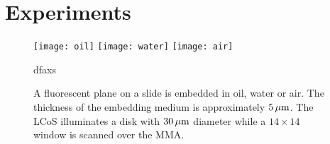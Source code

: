 \chapter{Experiments}


\begin{figure}[!hbt]
  \centering
  \texttt{[image: oil]}
  \texttt{[image: water]}
  \texttt{[image: air]}
  \caption{dfaxs}
  \label{fig:immersion-bfp-scan}
\end{figure}

\begin{figure}[!hbt]
  \centering
   
  \caption{A fluorescent plane on a slide is embedded in oil, water or
    air. The thickness of the embedding medium is approximately
    $\unit[5]{\mu m}$. The LCoS illuminates a disk with $\unit[30]{\mu
      m}$ diameter while a $14\times 14$ window is scanned over the
    MMA.}
  \label{fig:tirf-exp}
\end{figure}

